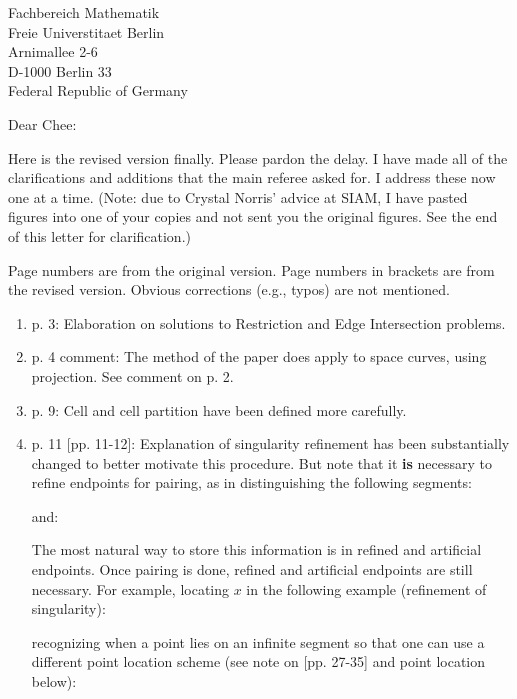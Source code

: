 \signature{John K. Johnstone}
\newcommand{\arc}[1]{\mbox{$\stackrel{\frown}{#1}$}}
\pagestyle{empty}

\begin{letter}
{Fachbereich Mathematik\\
Freie Universtitaet Berlin\\
Arnimallee 2-6\\
D-1000 Berlin 33\\
Federal Republic of Germany}

\opening{Dear Chee:}

Here is the revised version finally.
Please pardon the delay.
I have made all of the clarifications and additions that the main referee asked for.
I address these now one at a time.
(Note: due to Crystal Norris' advice at SIAM,
I have pasted figures into one of your copies and not sent
you the original figures.  See the end of this letter for clarification.)

Page numbers are from the original version.
Page numbers in brackets are from the revised version.
Obvious corrections (e.g., typos) are not mentioned.

\begin{enumerate}
\item
	p. 3: Elaboration on solutions to Restriction and Edge Intersection problems.
\item
	p. 4 comment: The method of the paper does apply to space curves, using projection.
	See comment on p. 2.
\item
	p. 9: Cell and cell partition have been defined more carefully.
\item
	p. 11 [pp. 11-12]: Explanation of singularity refinement has been 
	substantially changed to better motivate this procedure.
	But note that it {\bf is} necessary to refine endpoints for pairing, 
	as in distinguishing the following segments: \\
	\vspace{4in}

	and: 
	\vspace{2in}

	The most natural way to store this information is in refined and artificial 
	endpoints.
	Once pairing is done, refined and artificial endpoints are still necessary.
	For example, locating $x$ in the following example (refinement of singularity):\\
	\vspace{2in}
	
	recognizing when a point lies on an infinite segment so that one can use a different
	point location scheme (see note on [pp. 27-35] and point location below):\\
	\vspace{2in}


\end{enumerate}
\end{letter}
